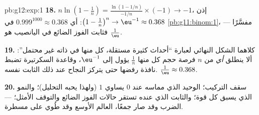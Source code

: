 \begin{solution}{pb:g12:exp:1}
\textbf{18.} $n \ln\!\left(1 - \frac1n\right) =
\frac{\ln(1 - 1/n)}{-1/n} \times (-1) \to -1$، إذن
$\left(1 - \frac1n\right)^n \to \eu^{-1} \approx 0.368$: أي
$0.999^{1000} \approx 0.368$ في \cref{pb:g11:binom:1}،
مفسَّرًا --- فثابت الفوز الضائع في اليانصيب هو
$\frac1\eu$.

\textbf{19.} كلاهما الشكل النهائي لعبارة ``أحداث كثيرة مستقلة،
كل منها في ذاته غير محتمل'':  ألا ينطلق
\emph{أي} من $n$ فرصة حجم كل منها $\frac1n$ يؤول إلى
$\eu^{-1}$، وقاعدة السكرتيرة تضبط نافذة رفضها
حتى يتركز النجاح عند ذلك الثابت نفسه.
$\frac1\eu \approx 0.368$.

\textbf{20.} سقف التركيب؛  الوحيد الذي
 مماسه عند $0$ يساوي $1$ (ولهذا يحبه التحليل)؛
والنمو الذي يسبق كل قوة؛ والثابت الذي عنده تستقر
حالات الفوز الضائع والتوقف الأمثل؛  ---
الضرب وقد صار جمعًا،  العالم الأوسع وقد
طُوي على مسطرة.
\end{solution}
